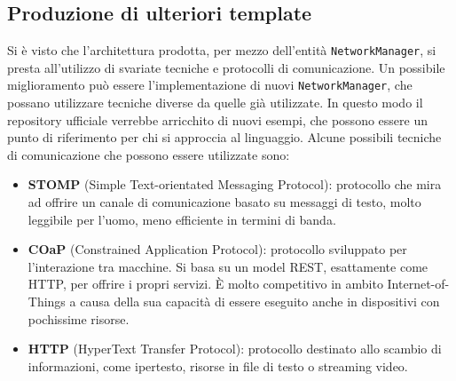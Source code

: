 \subsection{Produzione di ulteriori template}
Si è visto che l'architettura prodotta, per mezzo dell'entità
\texttt{NetworkManager}, si presta all'utilizzo di svariate tecniche e
protocolli di comunicazione. Un possibile miglioramento può essere
l'implementazione di nuovi \texttt{NetworkManager}, che possano utilizzare
tecniche diverse da quelle già utilizzate. In questo modo il repository
ufficiale verrebbe arricchito di nuovi esempi, che possono essere un punto di
riferimento per chi si approccia al linguaggio. Alcune possibili tecniche di
comunicazione che possono essere utilizzate sono:
\begin{itemize}
\item \textbf{STOMP} (Simple Text-orientated Messaging Protocol): protocollo che
  mira ad offrire un canale di comunicazione basato su messaggi di testo, molto
  leggibile per l'uomo, meno efficiente in termini di banda.
\item \textbf{COaP} (Constrained Application Protocol)\cite{rfc7252}: protocollo sviluppato
  per l'interazione tra macchine. Si basa su un model REST, esattamente come
  HTTP, per offrire i propri servizi. È molto competitivo in ambito
  Internet-of-Things a causa della sua capacità di essere eseguito anche in
  dispositivi con pochissime risorse.
\item \textbf{HTTP} (HyperText Transfer Protocol)\cite{rfc7540}: protocollo destinato allo
  scambio di informazioni, come ipertesto, risorse in file di testo o streaming
  video.
\end{itemize}

